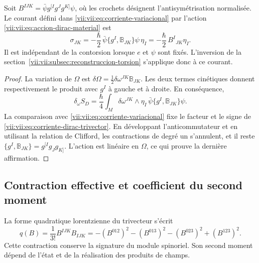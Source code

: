 \begin{proposition}
\label{vii:vii:prop:corriente-dirac-explicita}
Soit
\(B^{IJK}=\bar\psi g^{[I}g^Jg^{K]}\psi\), où les crochets
désignent l'antisymétrisation normalisée. Le courant défini dans
\eqref{vii:vii:eq:corriente-variacional} par l'action
\eqref{vii:vii:eq:accion-dirac-material} est
\begin{equation}
 \sigma_{JK}
 =-\frac{\hbar}{2}\,
   \bar\psi\{g^I,\mathbb B_{JK}\}\psi\,\eta_I
 =-\frac{\hbar}{2}\,B^I{}_{JK}\eta_I.
 \label{vii:vii:eq:corriente-dirac-trivector}
\end{equation}
Il est indépendant de la contorsion lorsque \(e\) et \(\psi\) sont
fixés. L'inversion de la section~\ref{vii:vii:subsec:reconstruccion-torsion}
s'applique donc à ce courant.
\end{proposition}
\begin{proof}
La variation de \(\Omega\) est \(\delta\Omega=\frac12\delta\omega^{JK}\mathbb B_{JK}\). Les deux termes cinétiques donnent respectivement le produit avec \(g^I\) à gauche et à droite. En conséquence,
\[
 \delta_\omega S_D
 =\frac{\hbar}{4}\int_M\delta\omega^{JK}\wedge\eta_I\,
                 \bar\psi\{g^I,\mathbb B_{JK}\}\psi.
\]
La comparaison avec \eqref{vii:vii:eq:corriente-variacional} fixe le
facteur et le signe de \eqref{vii:vii:eq:corriente-dirac-trivector}.
En développant l'anticommutateur et en utilisant la relation de Clifford,
les contractions de degré un s'annulent, et il reste
\(\{g^I,\mathbb B_{JK}\}=g^{[I}g_Jg_{K]}\).
L'action est linéaire en \(\Omega\), ce qui prouve la dernière
affirmation.
\end{proof}

\subsection{Contraction effective et coefficient du second moment}
\label{vii:vii:subsec:contraccion-espinorial}

La forme quadratique lorentzienne du trivecteur s'écrit
\begin{equation}
 q(B)=\frac1{3!}B^{IJK}B_{IJK}
 =-(B^{012})^2-(B^{013})^2-(B^{023})^2+(B^{123})^2.
 \label{vii:vii:eq:cuadratica-trivector}
\end{equation}
Cette contraction conserve la signature du module spinoriel. Son second moment dépend de l'état et de la réalisation des produits de champs.

